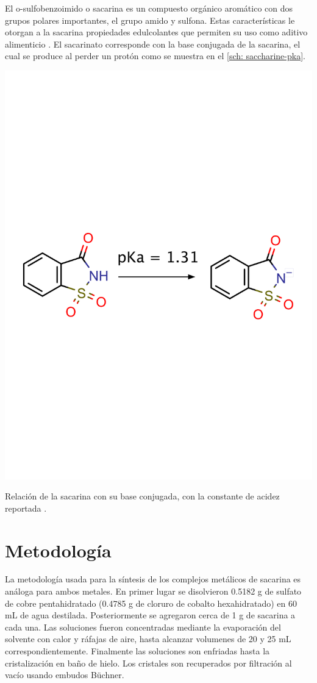 \documentclass[fleqn,10pt]{SelfArx} %
\begin{document}
	El o-sulfobenzoimido o sacarina es un compuesto org\'anico arom\'atico con dos grupos polares importantes, el grupo amido y sulfona. Estas caracter\'isticas le otorgan a la sacarina propiedades edulcolantes que permiten su uso como aditivo alimenticio \cite{Saccharine}. El sacarinato corresponde con la base conjugada de la sacarina, el cual se produce al perder un prot\'on como se muestra en el \autoref{sch: saccharine-pka}.
	\begin{scheme}[h]
		\centering
		\includegraphics[width=0.7\linewidth]{images/saccharine.pdf}
		\caption{Relaci\'on de la sacarina con su base conjugada, con la constante de acidez reportada \cite{Saccharine}.}
		\label{sch: saccharine-pka}
	\end{scheme}
    
	\section{Metodolog\'ia}
	La metodolog\'ia usada para la s\'intesis de los complejos met\'alicos de sacarina es an\'aloga para ambos metales. En primer lugar se disolvieron 0.5182 g de sulfato de cobre pentahidratado (0.4785 g de cloruro de cobalto hexahidratado) en 60 mL de agua destilada. Posteriormente se agregaron cerca de 1 g de sacarina a cada una. Las soluciones fueron concentradas mediante la evaporaci\'on del solvente con calor y r\'afajas de aire, hasta alcanzar volumenes de 20 y 25 mL correspondientemente. Finalmente las soluciones son enfriadas hasta la cristalizaci\'on en ba\~no de hielo. Los cristales son recuperados por filtraci\'on al vac\'io usando embudos B\"uchner. 
	
\end{document}
